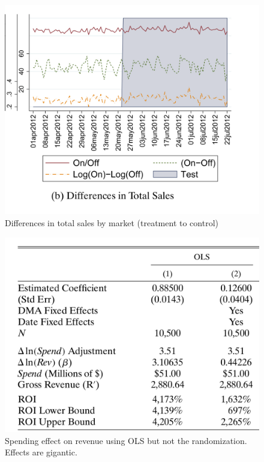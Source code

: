\documentclass{beamer}
\begin{document}
\begin{frame}

\begin{figure}
\begin{center}
\includegraphics[scale=0.2]{./lecture_includes/tadelis_fig2.png}
\caption{Differences in total sales by market (treatment to control)}
\end{center}
\end{figure}

\end{frame}

\begin{frame}

\begin{figure}
\begin{center}
\includegraphics[scale=0.2]{./lecture_includes/tadelis_ols1.png}
\caption{Spending effect on revenue using OLS but not the randomization. Effects are gigantic. }
\end{center}
\end{figure}

\end{frame}
\end{document}
